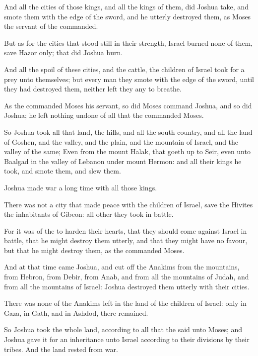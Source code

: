 \verse And all the cities of those kings, and all the kings of them, did Joshua take, and smote them with the edge of the sword, and he utterly destroyed them, as Moses the servant of the \LORD commanded.

\verse But as for the cities that stood still in their strength, Israel burned none of them, save Hazor only; that did Joshua burn.

\verse And all the spoil of these cities, and the cattle, the children of Israel took for a prey unto themselves; but every man they smote with the edge of the sword, until they had destroyed them, neither left they any to breathe.

\verse As the \LORD commanded Moses his servant, so did Moses command Joshua, and so did Joshua; he left nothing undone of all that the \LORD commanded Moses.

\verse So Joshua took all that land, the hills, and all the south country, and all the land of Goshen, and the valley, and the plain, and the mountain of Israel, and the valley of the same; \verse Even from the mount Halak, that goeth up to Seir, even unto Baalgad in the valley of Lebanon under mount Hermon: and all their kings he took, and smote them, and slew them.

\verse Joshua made war a long time with all those kings.

\verse There was not a city that made peace with the children of Israel, save the Hivites the inhabitants of Gibeon: all other they took in battle.

\verse For it was of the \LORD to harden their hearts, that they should come against Israel in battle, that he might destroy them utterly, and that they might have no favour, but that he might destroy them, as the \LORD commanded Moses.

\verse And at that time came Joshua, and cut off the Anakims from the mountains, from Hebron, from Debir, from Anab, and from all the mountains of Judah, and from all the mountains of Israel: Joshua destroyed them utterly with their cities.

\verse There was none of the Anakims left in the land of the children of Israel: only in Gaza, in Gath, and in Ashdod, there remained.

\verse So Joshua took the whole land, according to all that the \LORD said unto Moses; and Joshua gave it for an inheritance unto Israel according to their divisions by their tribes. And the land rested from war.


